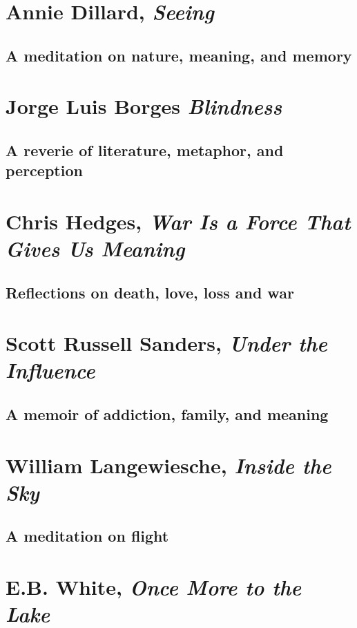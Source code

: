 \documentclass[letterpaper,oneside]{memoir}
\begin{document}
\begin{description}
\section{Annie Dillard, \textit{Seeing}}
\subsection{A meditation on nature, meaning, and memory}
\newpage
\addtocounter{page}{+9}
\vspace*{5cm}
\section{Jorge Luis Borges \textit{Blindness}}
\subsection{A reverie of literature, metaphor, and perception}
\newpage
\addtocounter{page}{+7}
\vspace*{5cm}
\section{Chris Hedges, \textit{War Is a Force That Gives Us Meaning}}
\subsection{Reflections on death, love, loss and war}
\newpage
\addtocounter{page}{+16}
\vspace*{5cm}
\section{Scott Russell Sanders, \textit{Under the Influence}}
\subsection{A memoir of addiction, family, and meaning}
\newpage
\addtocounter{page}{+8}
\vspace*{5cm}
\section{William Langewiesche, \textit{Inside the Sky}}
\subsection{A meditation on flight}
\newpage
\addtocounter{page}{+14}
\vspace*{5cm}
\section{E.B. White, \textit{Once More to the Lake}}

\end{description}
\end{document}
